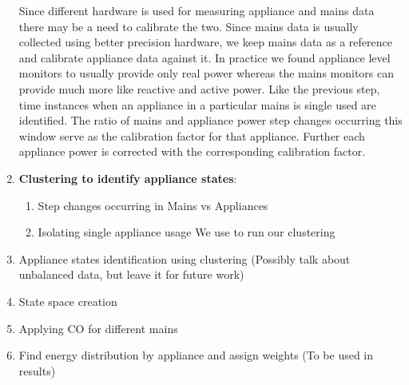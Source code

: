 \documentclass[conference]{IEEEtran}
\begin{document}
\begin{enumerate}
\begin{itemize}
\end{itemize}Since different hardware is used for measuring appliance and mains data there may be a need to calibrate the two. Since mains data is usually collected using better precision hardware, we keep mains data as a reference and calibrate appliance data against it. In practice we found appliance level monitors to usually provide only real power whereas the mains monitors can provide much more like reactive and active power. Like the previous step, time instances when an appliance in a particular mains is single used are identified. The ratio of mains and appliance power step changes occurring this window serve as the calibration factor for that appliance. Further each appliance power is corrected with the corresponding calibration factor.

\item \textbf{Clustering to identify appliance states}:
\begin{enumerate}
\item Step changes occurring in Mains vs Appliances
\item Isolating single appliance usage
We use \cite{kmeansplusplus} to run our clustering
\end{enumerate}
\item Appliance states identification using clustering (Possibly talk about unbalanced data, but leave it for future work)
\item State space creation
\item Applying CO for different mains
\item Find energy distribution by appliance and assign weights (To be used in results)

\end{enumerate}
\end{document}
